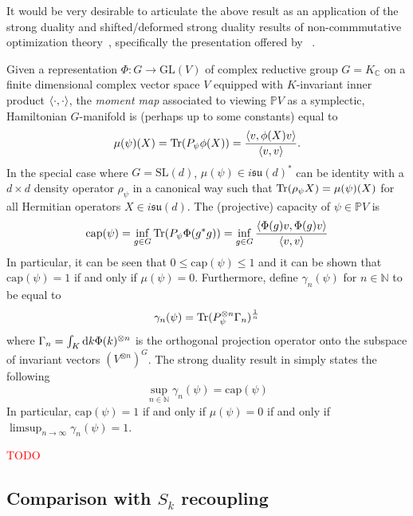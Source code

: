 \documentclass[notitlepage]{article}
\begin{document}
It would be very desirable to articulate the above result as an application of the strong duality and shifted/deformed strong duality results of non-commmutative optimization theory~\cite{burgisser2019towards}, specifically the presentation offered by \citeauthor{franks2020minimal}~\cite{franks2020minimal}.

Given a representation $\Phi : G \to \mathrm{GL}(V)$ of complex reductive group $G = K_{\mathbb C}$ on a finite dimensional complex vector space $V$ equipped with $K$-invariant inner product $\braket{\cdot, \cdot}$, the \textit{moment map} associated to viewing $\mathbb P V$ as a symplectic, Hamiltonian $G$-manifold is (perhaps up to some constants) equal to
\begin{equation}
    \mu (\psi) (X) = \operatorname{Tr}(P_{\psi} \phi(X)) = \frac{\braket{v, \phi(X) v}}{\braket{v,v}}.
\end{equation}
In the special case where $G = \mathrm{SL}(d)$, $\mu (\psi) \in i\mathfrak{su}(d)^{\ast}$ can be identity with a $d\times d$ density operator $\rho_{\psi}$ in a canonical way such that $\operatorname{Tr}(\rho_{\psi} X) = \mu (\psi)(X)$ for all Hermitian operators $X \in i\mathfrak{su}(d)$.
The (projective) capacity of $\psi \in \mathbb P V$ is
\begin{equation}
    \mathrm{cap}(\psi) = \inf_{g \in G} \operatorname{Tr}(P_{\psi} \Phi(g^{*}g)) = \inf_{g \in G} \frac{\braket{\Phi(g) v, \Phi(g) v}}{\braket{v,v}}
\end{equation}
In particular, it can be seen that $0 \leq \mathrm{cap}(\psi) \leq 1$ and it can be shown that $\mathrm{cap}(\psi) = 1$ if and only if $\mu(\psi) = 0$.
Furthermore, define $\gamma_n(\psi)$ for $n \in \mathbb N$ to be equal to
\begin{equation}
    \gamma_{n}(\psi) = \operatorname{Tr}(P_{\psi}^{\otimes n} \Gamma_{n})^{\frac{1}{n}}
\end{equation}
where $\Gamma_{n} = \int_{K} \mathrm{d} k \Phi(k)^{\otimes n}$ is the orthogonal projection operator onto the subspace of invariant vectors $(V^{\otimes n})^{G}$.
The strong duality result in \cite{franks2020minimal} simply states the following
\begin{equation}
    \sup_{n \in \mathbb N} \gamma_{n}(\psi) = \mathrm{cap}(\psi)
\end{equation}
In particular, $\mathrm{cap}(\psi) = 1$ if and only if $\mu(\psi) = 0$ if and only if $\limsup_{n\to\infty} \gamma_n(\psi) = 1$.

\textcolor{red}{TODO}
 
\subsection{Comparison with \texorpdfstring{$S_k$}{Sk} recoupling}
\end{document}
